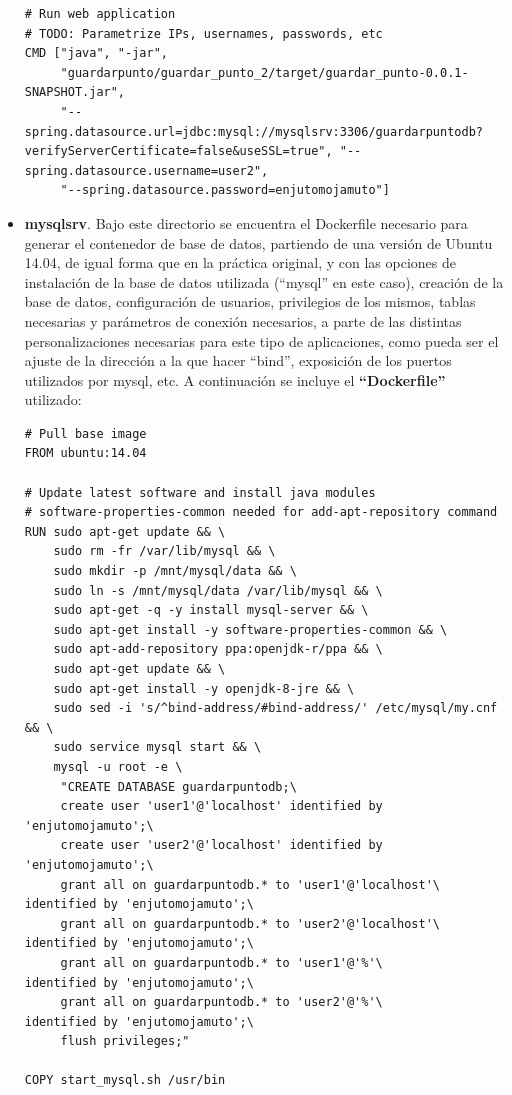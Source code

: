 \documentclass[12pt,spanish]{article}
\begin{document}
\begin{itemize}
\begin{verbatim}
# Run web application
# TODO: Parametrize IPs, usernames, passwords, etc
CMD ["java", "-jar",
     "guardarpunto/guardar_punto_2/target/guardar_punto-0.0.1-SNAPSHOT.jar",
     "--spring.datasource.url=jdbc:mysql://mysqlsrv:3306/guardarpuntodb?
verifyServerCertificate=false&useSSL=true", "--spring.datasource.username=user2",
     "--spring.datasource.password=enjutomojamuto"]
\end{verbatim}
\item{\textbf{mysqlsrv}}. Bajo este directorio se encuentra el Dockerfile necesario para generar el contenedor de base de datos, partiendo de una versión de Ubuntu 14.04, de igual forma que en la práctica original, y con las opciones de instalación de la base de datos utilizada (``mysql'' en este caso), creación de la base de datos, configuración de usuarios, privilegios de los mismos, tablas necesarias y parámetros de conexión necesarios, a parte de las distintas personalizaciones necesarias para este tipo de aplicaciones, como pueda ser el ajuste de la dirección a la que hacer ``bind'', exposición de los puertos utilizados por mysql, etc.
A continuación se incluye el \textbf{``Dockerfile''} utilizado:
\begin{verbatim}
# Pull base image
FROM ubuntu:14.04

# Update latest software and install java modules
# software-properties-common needed for add-apt-repository command
RUN sudo apt-get update && \
    sudo rm -fr /var/lib/mysql && \
    sudo mkdir -p /mnt/mysql/data && \
    sudo ln -s /mnt/mysql/data /var/lib/mysql && \
    sudo apt-get -q -y install mysql-server && \
    sudo apt-get install -y software-properties-common && \
    sudo apt-add-repository ppa:openjdk-r/ppa && \
    sudo apt-get update && \
    sudo apt-get install -y openjdk-8-jre && \
    sudo sed -i 's/^bind-address/#bind-address/' /etc/mysql/my.cnf && \
    sudo service mysql start && \
    mysql -u root -e \
     "CREATE DATABASE guardarpuntodb;\
     create user 'user1'@'localhost' identified by 'enjutomojamuto';\
     create user 'user2'@'localhost' identified by 'enjutomojamuto';\
     grant all on guardarpuntodb.* to 'user1'@'localhost'\
identified by 'enjutomojamuto';\
     grant all on guardarpuntodb.* to 'user2'@'localhost'\
identified by 'enjutomojamuto';\
     grant all on guardarpuntodb.* to 'user1'@'%'\
identified by 'enjutomojamuto';\
     grant all on guardarpuntodb.* to 'user2'@'%'\
identified by 'enjutomojamuto';\
     flush privileges;"

COPY start_mysql.sh /usr/bin


\end{verbatim}
\end{itemize}
\end{document}
